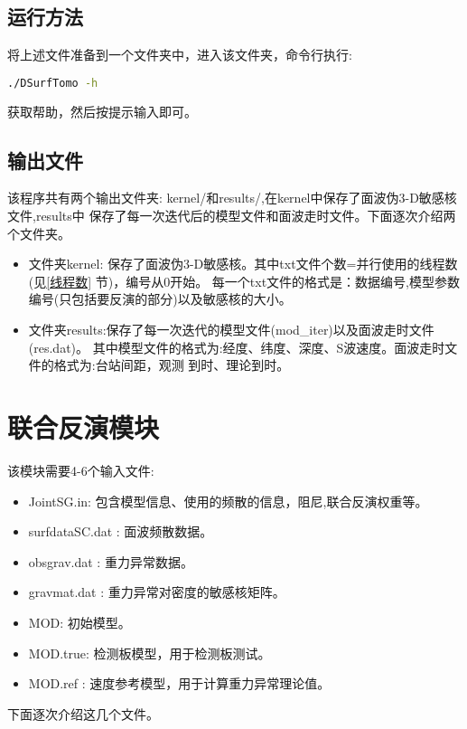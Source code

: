 \documentclass[10p,UTF8]{ctexart}
\begin{document}
   \subsection{运行方法}
   将上述文件准备到一个文件夹中，进入该文件夹，命令行执行:
   \begin{lstlisting}[language=bash]
    ./DSurfTomo -h
   \end{lstlisting}
   获取帮助，然后按提示输入即可。

   \subsection{输出文件}\label{面波输出文件}
   该程序共有两个输出文件夹: kernel/和results/,在kernel中保存了面波伪3-D敏感核文件,results中
   保存了每一次迭代后的模型文件和面波走时文件。下面逐次介绍两个文件夹。
   \begin{itemize}
    \item 文件夹kernel: 保存了面波伪3-D敏感核。其中txt文件个数=并行使用的线程数(见\ref{线程数} 节)，编号从0开始。
           每一个txt文件的格式是：数据编号,模型参数编号(只包括要反演的部分)以及敏感核的大小。
    \item 文件夹results:保存了每一次迭代的模型文件(mod\_iter\*)以及面波走时文件(res\*.dat)。
            其中模型文件的格式为:经度、纬度、深度、S波速度。面波走时文件的格式为:台站间距，观测
            到时、理论到时。
    \end{itemize}

   \section{联合反演模块}
   该模块需要4-6个输入文件:
    \begin{itemize}
        \item JointSG.in: 包含模型信息、使用的频散的信息，阻尼,联合反演权重等。
        \item surfdataSC.dat : 面波频散数据。
        \item obsgrav.dat : 重力异常数据。
        \item gravmat.dat : 重力异常对密度的敏感核矩阵。
        \item MOD: 初始模型。
        \item MOD.true: 检测板模型，用于检测板测试。
        \item MOD.ref : 速度参考模型，用于计算重力异常理论值。
    \end{itemize}
    下面逐次介绍这几个文件。
\end{document}

